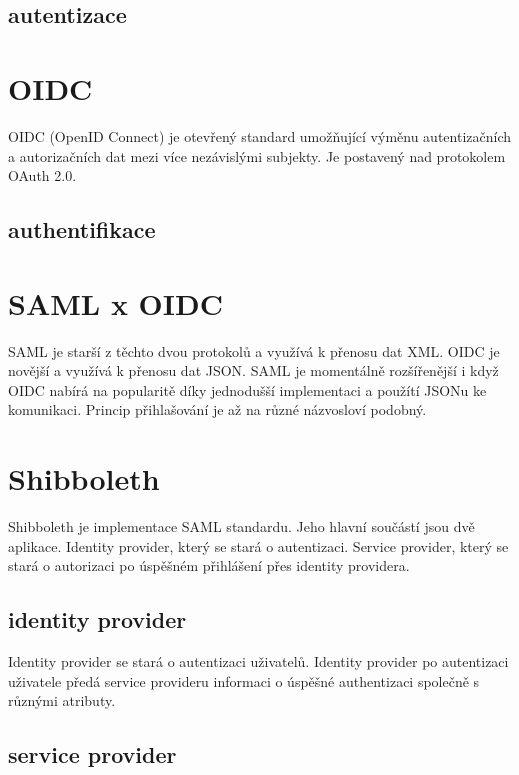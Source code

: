 \subsection{autentizace}



\section{OIDC}

OIDC (OpenID Connect) je otevřený standard umožňující výměnu autentizačních a autorizačních dat mezi více nezávislými subjekty. Je postavený nad protokolem OAuth 2.0.\cite{OIDC}

\subsection{authentifikace}

\section{SAML x OIDC}

SAML je starší z těchto dvou protokolů a využívá k přenosu dat XML. OIDC je novější a využívá k přenosu dat JSON. 
SAML je momentálně rozšířenější i když OIDC nabírá na popularitě díky jednodušší implementaci a použítí JSONu ke komunikaci.\cite{SAMLxOIDC}
Princip přihlašování je až na různé názvosloví podobný.

\section{Shibboleth}

Shibboleth je implementace SAML standardu. Jeho hlavní součástí jsou dvě aplikace. Identity provider, který se stará o autentizaci. Service provider, který se stará o autorizaci po úspěšném přihlášení přes identity providera. \cite{shibbolethWiki}

\subsection{identity provider}

Identity provider se stará o autentizaci uživatelů. Identity provider po autentizaci uživatele předá service provideru informaci o úspěšné authentizaci společně s různými atributy.

\subsection{service provider}

